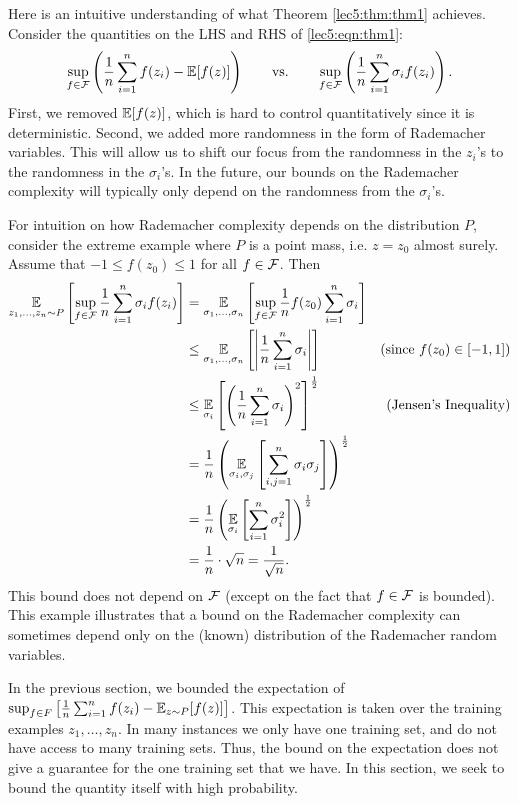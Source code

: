 Here is an intuitive understanding of what Theorem \ref{lec5:thm:thm1} achieves. Consider the quantities on the LHS and RHS of \eqref{lec5:eqn:thm1}:
\begin{align*}
    \sup_{f\in \mathcal F} \left(\frac{1}{n} \sum_{i=1}^n f(z_i) - \operatorname*{\mathbb{E}}[f(z)]\right) \qquad \text{vs.} \qquad \sup_{f\in \mathcal F} \left(\frac{1}{n} \sum_{i=1}^n \sigma_i f(z_i)\right).
\end{align*}
First, we removed $\operatorname*{\mathbb{E}}[f(z)]$, which is hard to control quantitatively since it is deterministic. Second, we added more randomness in the form of Rademacher variables. This will allow us to shift our focus from the randomness in the $z_i$'s to the randomness in the $\sigma_i$'s. In the future, our bounds on the Rademacher complexity will typically only depend on the randomness from the $\sigma_i$'s.

For intuition on how Rademacher complexity depends on the distribution $P$, consider the extreme example where $P$ is a point mass, i.e. $z = z_0$ almost surely. Assume that $-1 \leq f(z_0) \leq 1$ for all $f \in \mathcal F$. Then
\begin{align}
    \operatorname*{\mathbb{E}}_{z_1, \dots, z_n \sim P} \left[ \sup_{f \in \mathcal F} \frac{1}{n} \sum^n_{i=1} \sigma_i f(z_i)\right]
    &= \operatorname*{\mathbb{E}}_{\sigma_1, \dots, \sigma_n} \left[ \sup_{f \in \mathcal F} \frac{1}{n}f(z_0) \sum^n_{i=1} \sigma_i \right] \\
    &\leq \operatorname*{\mathbb{E}}_{\sigma_1, \dots, \sigma_n} \left[ \left| \frac{1}{n} \sum^n_{i=1} \sigma_i \right|\right] &(\text{since } f(z_0) \in [-1,1]) \\
    &\leq \operatorname*{\mathbb{E}}_{\sigma_i} \left[ \left( \frac{1}{n} \sum^n_{i=1} \sigma_i \right)^2\right]^\frac{1}{2} &(\text{Jensen's Inequality}) \\
    &= \frac{1}{n}\left( \operatorname*{\mathbb{E}}_{\sigma_i, \sigma_j} \left[ \sum^n_{i, j=1} \sigma_i\sigma_j \right] \right)^\frac{1}{2}\\
    &= \frac{1}{n}\left( \operatorname*{\mathbb{E}}_{\sigma_i} \left[ \sum^n_{i=1} \sigma_i^2 \right] \right)^\frac{1}{2} \\
    &= \frac{1}{n} \cdot \sqrt{n} = \frac{1}{\sqrt{n}}.
\end{align}
This bound does not depend on $\mathcal F$ (except on the fact that $f \in \mathcal F$ is bounded). This example illustrates that a bound on the Rademacher complexity can sometimes depend only on the (known) distribution of the Rademacher random variables.


In the previous section, we bounded the expectation of $\sup_{f\in F} \left[ \frac{1}{n} \sum^n_{i=1} f(z_i) -  \operatorname*{\mathbb{E}}_{z\sim P} [f(z)] \right]$. This expectation is taken over the training examples $z_1, \dots, z_n$. In many instances we only have one training set, and do not have access to many training sets. Thus, the bound on the expectation does not give a guarantee for the one training set that we have. In this section, we seek to bound the quantity itself with high probability.

